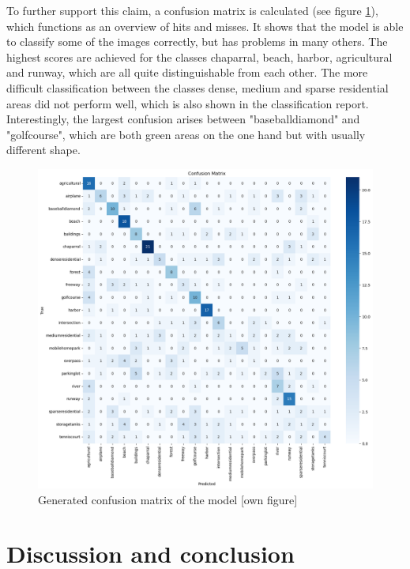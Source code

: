 \documentclass[oneside,twocolumn,10pt,cleanfoot,cleanhead]{asme2ej}
\begin{document}
To further support this claim, a confusion matrix is calculated (see figure \ref{c_matrix}), which functions as an overview of hits and misses.
It shows that the model is able to classify some of the images correctly, but has problems in many others.
The highest scores are achieved for the classes chaparral, beach, harbor, agricultural and runway, which are all quite distinguishable from each other.
The more difficult classification between the classes dense, medium and sparse residential areas did not perform well, which is also shown in the classification report.
Interestingly, the largest confusion arises between "baseballdiamond" and "golfcourse", which are both green areas on the one hand but with usually different shape.

\begin{figure}[ht]
    \centerline{\includegraphics[width=6.85in]{pics/confusion_matrix.png}}
    \caption{Generated confusion matrix of the model [own figure]}
    \label{c_matrix}
\end{figure}


\section{Discussion and conclusion}
\end{document}
